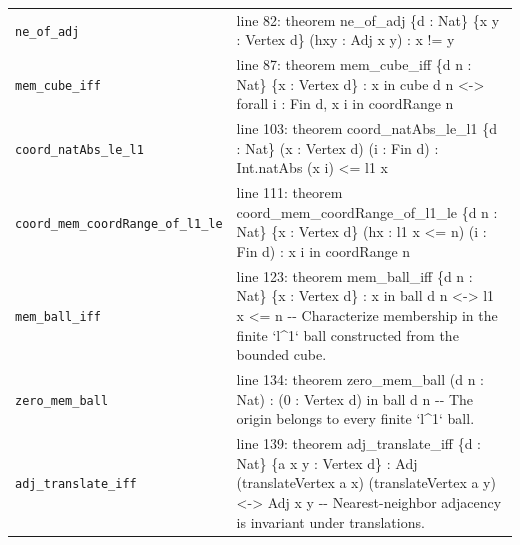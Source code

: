 \documentclass[10pt]{article}
\begin{document}
\begin{longtable}{>{\raggedright\arraybackslash}p{} >{\raggedright\arraybackslash}p{}}
\texttt{ne\_\allowbreak{}of\_\allowbreak{}adj} & {\ttfamily\scriptsize line 82:\allowbreak{} theorem ne\_\allowbreak{}of\_\allowbreak{}adj \{d :\allowbreak{} Nat\} \{x y :\allowbreak{} Vertex d\} (\allowbreak{}hxy :\allowbreak{} Adj x y)\allowbreak{} :\allowbreak{} x !=\allowbreak{} y} \\[0.45em]
\texttt{mem\_\allowbreak{}cube\_\allowbreak{}iff} & {\ttfamily\scriptsize line 87:\allowbreak{} theorem mem\_\allowbreak{}cube\_\allowbreak{}iff \{d n :\allowbreak{} Nat\} \{x :\allowbreak{} Vertex d\} :\allowbreak{} x in cube d n <-\allowbreak{}> forall i :\allowbreak{} Fin d,\allowbreak{} x i in coordRange n} \\[0.45em]
\texttt{coord\_\allowbreak{}natAbs\_\allowbreak{}le\_\allowbreak{}l1} & {\ttfamily\scriptsize line 103:\allowbreak{} theorem coord\_\allowbreak{}natAbs\_\allowbreak{}le\_\allowbreak{}l1 \{d :\allowbreak{} Nat\} (\allowbreak{}x :\allowbreak{} Vertex d)\allowbreak{} (\allowbreak{}i :\allowbreak{} Fin d)\allowbreak{} :\allowbreak{} Int.\allowbreak{}natAbs (\allowbreak{}x i)\allowbreak{} <=\allowbreak{} l1 x} \\[0.45em]
\texttt{coord\_\allowbreak{}mem\_\allowbreak{}coordRange\_\allowbreak{}of\_\allowbreak{}l1\_\allowbreak{}le} & {\ttfamily\scriptsize line 111:\allowbreak{} theorem coord\_\allowbreak{}mem\_\allowbreak{}coordRange\_\allowbreak{}of\_\allowbreak{}l1\_\allowbreak{}le \{d n :\allowbreak{} Nat\} \{x :\allowbreak{} Vertex d\} (\allowbreak{}hx :\allowbreak{} l1 x <=\allowbreak{} n)\allowbreak{} (\allowbreak{}i :\allowbreak{} Fin d)\allowbreak{} :\allowbreak{} x i in coordRange n} \\[0.45em]
\texttt{mem\_\allowbreak{}ball\_\allowbreak{}iff} & {\ttfamily\scriptsize line 123:\allowbreak{} theorem mem\_\allowbreak{}ball\_\allowbreak{}iff \{d n :\allowbreak{} Nat\} \{x :\allowbreak{} Vertex d\} :\allowbreak{} x in ball d n <-\allowbreak{}> l1 x <=\allowbreak{} n -\allowbreak{}-\allowbreak{} Characterize membership in the finite `l\textasciicircum{}1` ball constructed from the bounded cube.\allowbreak{}} \\[0.45em]
\texttt{zero\_\allowbreak{}mem\_\allowbreak{}ball} & {\ttfamily\scriptsize line 134:\allowbreak{} theorem zero\_\allowbreak{}mem\_\allowbreak{}ball (\allowbreak{}d n :\allowbreak{} Nat)\allowbreak{} :\allowbreak{} (\allowbreak{}0 :\allowbreak{} Vertex d)\allowbreak{} in ball d n -\allowbreak{}-\allowbreak{} The origin belongs to every finite `l\textasciicircum{}1` ball.\allowbreak{}} \\[0.45em]
\texttt{adj\_\allowbreak{}translate\_\allowbreak{}iff} & {\ttfamily\scriptsize line 139:\allowbreak{} theorem adj\_\allowbreak{}translate\_\allowbreak{}iff \{d :\allowbreak{} Nat\} \{a x y :\allowbreak{} Vertex d\} :\allowbreak{} Adj (\allowbreak{}translateVertex a x)\allowbreak{} (\allowbreak{}translateVertex a y)\allowbreak{} <-\allowbreak{}> Adj x y -\allowbreak{}-\allowbreak{} Nearest-\allowbreak{}neighbor adjacency is invariant under translations.\allowbreak{}} \\[0.45em]

\end{longtable}
\end{document}
